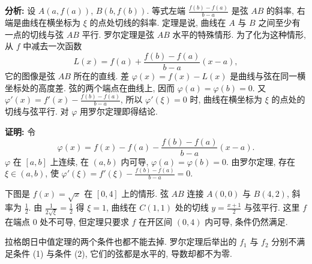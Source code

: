 \documentclass[UTF8,openany]{ctexbook}
\theoremstyle{chinesetextbook}
\newenvironment{cnproof}{\par\indent\textbf{证明:} \ignorespaces}{\par}
\begin{document}
\par\indent\textbf{分析:} 设 $A(a,f(a))$, $B(b,f(b))$. 等式左端 $\displaystyle\frac{f(b)-f(a)}{b-a}$ 是弦 $AB$ 的斜率, 右端是曲线在横坐标为 $\xi$ 的点处切线的斜率. 定理是说, 曲线在 $A$ 与 $B$ 之间至少有一点的切线与弦 $AB$ 平行. 罗尔定理是弦 $AB$ 水平的特殊情形. 为了化为这种情形, 从 $f$ 中减去一次函数
\[
L(x)=f(a)+\frac{f(b)-f(a)}{b-a}(x-a),
\]
它的图像是弦 $AB$ 所在的直线. 差 $\varphi(x)=f(x)-L(x)$ 是曲线与弦在同一横坐标处的高度差. 弦的两个端点在曲线上, 因而 $\varphi(a)=\varphi(b)=0$. 又 $\displaystyle\varphi'(x)=f'(x)-\frac{f(b)-f(a)}{b-a}$, 所以 $\varphi'(\xi)=0$ 时, 曲线在横坐标为 $\xi$ 的点处的切线与弦平行. 对 $\varphi$ 用罗尔定理即得结论.
\begin{cnproof}
令
\[
\varphi(x)=f(x)-f(a)-\frac{f(b)-f(a)}{b-a}(x-a).
\]
$\varphi$ 在 $[a,b]$ 上连续, 在 $(a,b)$ 内可导, $\varphi(a)=\varphi(b)=0$. 由罗尔定理, 存在 $\xi\in(a,b)$, 使 $\displaystyle\varphi'(\xi)=f'(\xi)-\frac{f(b)-f(a)}{b-a}=0$.
\end{cnproof}
下图是 $f(x)=\sqrt x$ 在 $[0,4]$ 上的情形. 弦 $AB$ 连接 $A(0,0)$ 与 $B(4,2)$, 斜率为 $\displaystyle\frac12$. 由 $\displaystyle\frac1{2\sqrt\xi}=\frac12$ 得 $\xi=1$, 曲线在 $C(1,1)$ 处的切线 $\displaystyle y=\frac{x+1}2$ 与弦平行. 这里 $f$ 在端点 $0$ 处不可导, 但定理只要求 $f$ 在开区间 $(0,4)$ 内可导, 条件仍然满足.
\begin{center}
\end{center}

拉格朗日中值定理的两个条件也都不能去掉. 罗尔定理后举出的 $f_1$ 与 $f_2$ 分别不满足条件 (1) 与条件 (2), 它们的弦都是水平的, 导数却都不为零.
\end{document}
